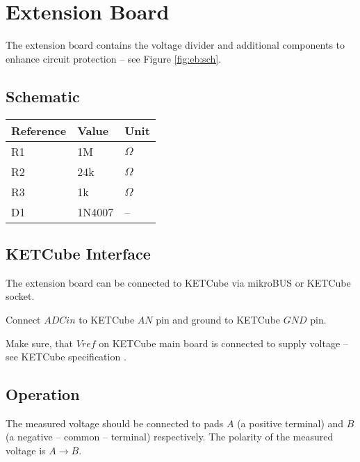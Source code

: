 \documentclass[twoside,a4paper]{refart}
\begin{document}
\clearpage
\section{Extension Board}
The extension board contains the voltage divider and additional components to enhance circuit protection -- see Figure \ref{fig:eb:sch}.

\subsection{Schematic}

\begin{table*}[!ht]
    \begin{tabular}{| p{2cm} | p{2cm} | p{1.5cm} |}
        \hline
        \rowcolor{SeaGreen3!30!} {\bf Reference} & {\bf Value} & {\bf Unit} \\
        \hline
        \hline
        R1 & 1M & $\Omega$ \\
        \hline
        R2 & 24k & $\Omega$ \\
        \hline
        R3 & 1k & $\Omega$ \\
        \hline
        D1 & 1N4007 & -- \\
        \hline
    \end{tabular}
    \label{tab:eb:values}
   \end{table*}

\subsection{KETCube Interface}
  The extension board can be connected to KETCube via mikroBUS or KETCube socket. 
  
  Connect $ADCin$ to KETCube $AN$ pin and ground to KETCube $GND$ pin.
  
  Make sure, that $Vref$ on KETCube main board is connected to supply voltage -- see KETCube specification \cite{ZCU:KETCube:05-2018}.
  
\subsection{Operation}
  The measured voltage should be connected to pads $A$ (a positive terminal) and $B$ (a negative -- common -- terminal) respectively. The polarity of the measured voltage is $A \rightarrow B$. 
\end{document}
